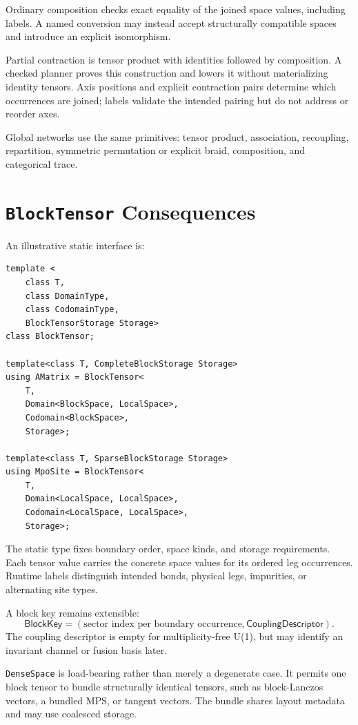 \documentclass[11pt]{article}
\begin{document}
Ordinary composition checks exact equality of the joined space
values, including labels.  A named conversion may instead accept
structurally compatible spaces and introduce an explicit isomorphism.

Partial contraction is tensor product with identities followed by
composition.  A checked planner proves this construction and lowers it
without materializing identity tensors.  Axis positions and explicit
contraction pairs determine which occurrences are joined; labels
validate the intended pairing but do not address or reorder axes.

Global networks use the same primitives: tensor product, association,
recoupling, repartition, symmetric permutation or explicit braid,
composition, and categorical trace.

\section{\texttt{BlockTensor} Consequences}

An illustrative static interface is:

\begin{verbatim}
template <
    class T,
    class DomainType,
    class CodomainType,
    BlockTensorStorage Storage>
class BlockTensor;

template<class T, CompleteBlockStorage Storage>
using AMatrix = BlockTensor<
    T,
    Domain<BlockSpace, LocalSpace>,
    Codomain<BlockSpace>,
    Storage>;

template<class T, SparseBlockStorage Storage>
using MpoSite = BlockTensor<
    T,
    Domain<LocalSpace, LocalSpace>,
    Codomain<LocalSpace, LocalSpace>,
    Storage>;
\end{verbatim}

The static type fixes boundary order, space kinds, and storage requirements.
Each tensor value carries the concrete space values for its ordered leg
occurrences.  Runtime labels distinguish intended bonds, physical legs,
impurities, or alternating site types.

A block key remains extensible:
\[
  \mathsf{BlockKey}
  =
  (\text{sector index per boundary occurrence},
   \mathsf{CouplingDescriptor}).
\]
The coupling descriptor is empty for multiplicity-free U(1), but may
identify an invariant channel or fusion basis later.

\texttt{DenseSpace} is load-bearing rather than merely a degenerate
case.  It permits one block tensor to bundle structurally identical
tensors, such as block-Lanczos vectors, a bundled MPS, or tangent
vectors.  The bundle shares layout metadata and may use coalesced
storage.
\end{document}
